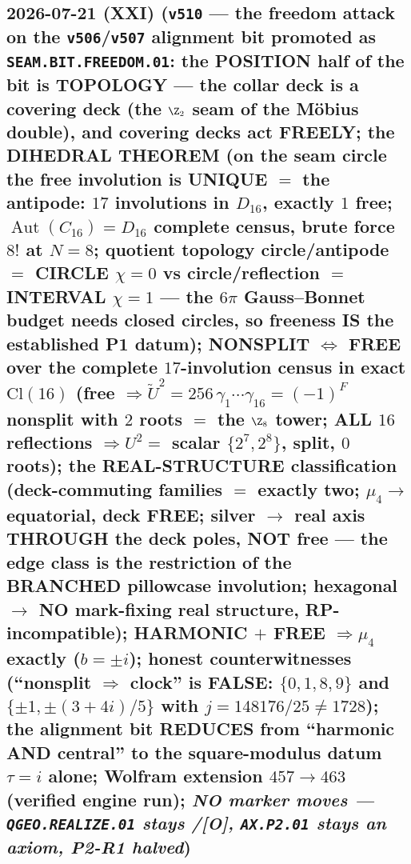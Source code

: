 \documentclass[11pt]{article}
\providecommand{\mO}{\textbf{[O]}}\providecommand{\mX}{\textbf{[X]}}
\providecommand{\Aut}{\operatorname{Aut}}
\begin{document}
\subsection*{2026-07-21 (XXI) (\texttt{v510} --- the freedom attack on the \texttt{v506}/\texttt{v507} alignment bit promoted as \texttt{SEAM.BIT.FREEDOM.01}: the POSITION half of the bit is TOPOLOGY --- the collar deck is a covering deck (the $\Z_2$ seam of the M\"obius double), and covering decks act FREELY; the DIHEDRAL THEOREM (on the seam circle the free involution is UNIQUE $=$ the antipode: $17$ involutions in $D_{16}$, exactly $1$ free; $\Aut(C_{16})=D_{16}$ complete census, brute force $8!$ at $N{=}8$; quotient topology circle/antipode $=$ CIRCLE $\chi{=}0$ vs circle/reflection $=$ INTERVAL $\chi{=}1$ --- the $6\pi$ Gauss--Bonnet budget needs closed circles, so freeness IS the established P1 datum); NONSPLIT $\iff$ FREE over the complete $17$-involution census in exact $\mathrm{Cl}(16)$ (free $\Rightarrow\tilde U^2=256\,\gamma_1\cdots\gamma_{16}=(-1)^F$ nonsplit with $2$ roots $=$ the $\Z_8$ tower; ALL $16$ reflections $\Rightarrow U^2=$ scalar $\{2^7,2^8\}$, split, $0$ roots); the REAL-STRUCTURE classification (deck-commuting families $=$ exactly two; $\mu_4\to$ equatorial, deck FREE; silver $\to$ real axis THROUGH the deck poles, NOT free --- the edge class is the restriction of the BRANCHED pillowcase involution; hexagonal $\to$ NO mark-fixing real structure, RP-incompatible); HARMONIC $+$ FREE $\Rightarrow\mu_4$ exactly ($b=\pm i$); honest counterwitnesses (``nonsplit $\Rightarrow$ clock'' is FALSE: $\{0,1,8,9\}$ and $\{\pm1,\pm(3{+}4i)/5\}$ with $j=148176/25\neq1728$); the alignment bit REDUCES from ``harmonic AND central'' to the square-modulus datum $\tau=i$ alone; Wolfram extension $457\to463$ (verified engine run); \emph{NO marker moves --- \texttt{QGEO.REALIZE.01} stays \mC/\mO, \texttt{AX.P2.01} stays an axiom, P2-R1 halved})}
\end{document}
